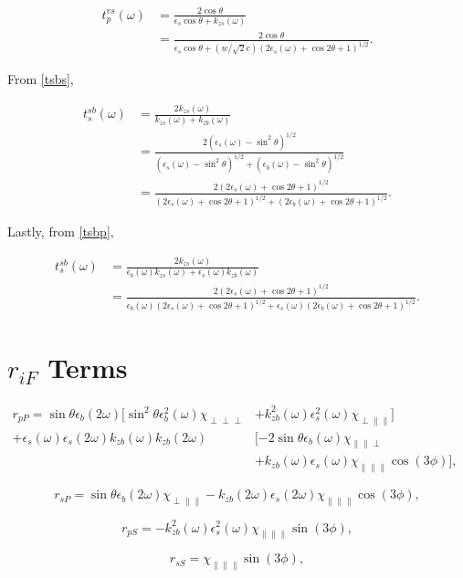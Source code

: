 \documentclass{article}
\begin{document}
\begin{align}
t^{vs}_{p}(\omega) &= \frac{2\cos\theta}{\epsilon_{s}\cos\theta + k_{zs}(\omega)} \nonumber \\
&=\frac{2\cos\theta}{\epsilon_{s}\cos\theta + (w/\sqrt{2}c)(2\epsilon_{s}(\omega) + \cos 2\theta + 1)^{1/2}}.
\end{align}

From \eqref{tsbs},

\begin{align}
t^{sb}_{s}(\omega) &= \frac{2k_{zs}(\omega)}{k_{zs}(\omega) + k_{zb}(\omega)} \nonumber \\
&= \frac{2(\epsilon_{s}(\omega) - \sin^{2}\theta)^{1/2}}{(\epsilon_{s}(\omega) - \sin^{2}\theta)^{1/2} + (\epsilon_{b}(\omega) - \sin^{2}\theta)^{1/2}} \nonumber \\
&=\frac{2(2\epsilon_{s}(\omega) + \cos 2\theta + 1)^{1/2}}{(2\epsilon_{s}(\omega) + \cos 2\theta + 1)^{1/2} + (2\epsilon_{b}(\omega) + \cos 2\theta + 1)^{1/2}}.
\end{align}

Lastly, from \eqref{tsbp},

\begin{align}
t^{sb}_{s}(\omega) &= \frac{2k_{zs}(\omega)}{\epsilon_{b}(\omega)k_{zs}(\omega) + \epsilon_{s}(\omega)k_{zb}(\omega)} \nonumber \\
&=\frac{2(2\epsilon_{s}(\omega) + \cos 2\theta + 1)^{1/2}}{\epsilon_{b}(\omega)(2\epsilon_{s}(\omega) + \cos 2\theta + 1)^{1/2} + \epsilon_{s}(\omega)(2\epsilon_{b}(\omega) + \cos 2\theta + 1)^{1/2}}.
\end{align}

\section{$r_{iF}$ Terms}

\begin{align}
r_{pP} = \sin\theta\epsilon_{b}(2\omega)[\sin^{2}\theta\epsilon^{2}_{b}(\omega)\chi_{\perp\perp\perp} &+ k^{2}_{zb}(\omega)\epsilon^{2}_{s}(\omega)\chi_{\perp\parallel\parallel}] \nonumber \\
+ \epsilon_{s}(\omega)\epsilon_{s}(2\omega)k_{zb}(\omega)k_{zb}(2\omega)&[-2\sin\theta\epsilon_{b}(\omega)\chi_{\parallel\parallel\perp}&\\
&+ k_{zb}(\omega)\epsilon_{s}(\omega)\chi_{\parallel\parallel\parallel}\cos(3\phi)], \nonumber
\end{align}

\begin{equation}
r_{sP} = \sin\theta\epsilon_{b}(2\omega)\chi_{\perp\parallel\parallel} - k_{zb}(2\omega)\epsilon_{s}(2\omega)\chi_{\parallel\parallel\parallel}\cos(3\phi),
\end{equation}

\begin{equation}
r_{pS} = -k^{2}_{zb}(\omega)\epsilon^{2}_{s}(\omega)\chi_{\parallel\parallel\parallel}\sin(3\phi),
\end{equation}

\begin{equation}
r_{sS} = \chi_{\parallel\parallel\parallel}\sin(3\phi),
\end{equation}



\end{document}
